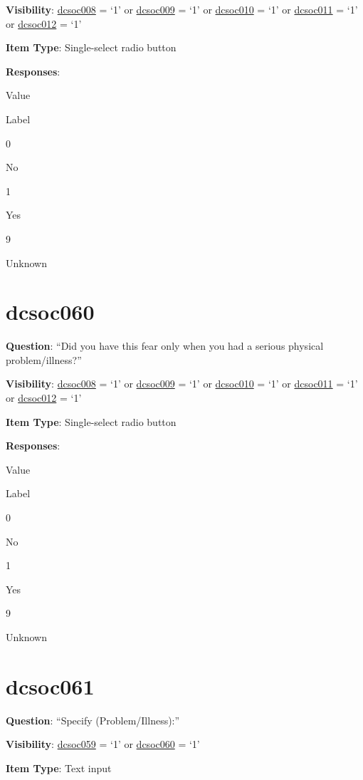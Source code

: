\documentclass[]{book}
\begin{document}
\textbf{Visibility}: \protect\hyperlink{dcsoc008}{dcsoc008} = `1' or \protect\hyperlink{dcsoc009}{dcsoc009} = `1' or \protect\hyperlink{dcsoc010}{dcsoc010} = `1' or \protect\hyperlink{dcsoc011}{dcsoc011} = `1' or \protect\hyperlink{dcsoc012}{dcsoc012} = `1'

\textbf{Item Type}: Single-select radio button

\textbf{Responses}:

Value

Label

0

No

1

Yes

9

Unknown

\hypertarget{dcsoc060}{%
\section{dcsoc060}\label{dcsoc060}}

\textbf{Question}: ``Did you have this fear only when you had a serious physical problem/illness?''

\textbf{Visibility}: \protect\hyperlink{dcsoc008}{dcsoc008} = `1' or \protect\hyperlink{dcsoc009}{dcsoc009} = `1' or \protect\hyperlink{dcsoc010}{dcsoc010} = `1' or \protect\hyperlink{dcsoc011}{dcsoc011} = `1' or \protect\hyperlink{dcsoc012}{dcsoc012} = `1'

\textbf{Item Type}: Single-select radio button

\textbf{Responses}:

Value

Label

0

No

1

Yes

9

Unknown

\hypertarget{dcsoc061}{%
\section{dcsoc061}\label{dcsoc061}}

\textbf{Question}: ``Specify (Problem/Illness):''

\textbf{Visibility}: \protect\hyperlink{dcsoc059}{dcsoc059} = `1' or \protect\hyperlink{dcsoc060}{dcsoc060} = `1'

\textbf{Item Type}: Text input
\end{document}

